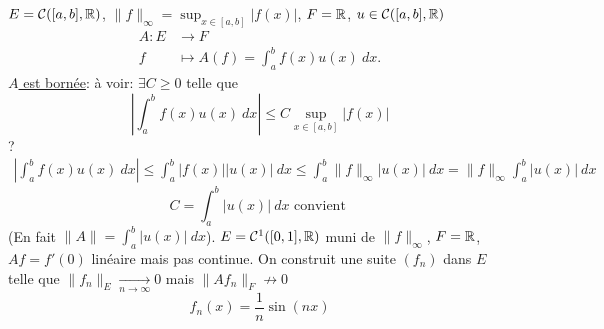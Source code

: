 \begin{eg}
    $E = \mathcal{C}([a, b], \mathbb{R})$, $\|f\|_{\infty} = \sup_{x \in [a, b]} |f(x)|$, $F = \mathbb{R}$, $u \in \mathcal{C}([a, b], \mathbb{R})$
    \begin{align*}
        A: E &\longrightarrow F \\
        f &\longmapsto A(f) = \int_{{a}}^{{b}} {f(x)u(x)} \: d{x} {}
    .\end{align*}
    \underline{$A$ est bornée}: à voir: $\exists C \ge 0$ telle que  
    \[
        \left| \int_{{a}}^{{b}} {f(x)u(x)} \: d{x} {} \right| \le C \sup_{x \in [a, b]} |f(x)|
    \] 
    ?
    \begin{align*}
        \left| \int_{{a}}^{{b}} {f(x)u(x)} \: d{x} {} \right| \le \int_{{a}}^{{b}} {|f(x)| |u(x)|} \: d{x} {} \le \int_{{a}}^{{b}} {\|f\|_{\infty}|u(x)|} \: d{x} {= \|f\|_{\infty} \int_{{a}}^{{b}} {|u(x)|} \: d{x} {}}
    \end{align*}
    \[
    C = \int_{{a}}^{{b}} {|u(x)|} \: d{x} \text{ convient }
    \] 
    (En fait $\|A\| = \int_{{a}}^{{b}} {|u(x)|} \: d{x} {}$). $E = \mathcal{C}^1([0,1], \mathbb{R})$ muni de $\|f\|_{\infty}$, $F = \mathbb{R}$, $Af = f'(0)$ linéaire mais pas continue. On construit une suite  $(f_n)$ dans  $E$ telle que  $\|f_n\|_E \xrightarrow[n \to  \infty]{} 0$ mais $\|Af_n\|_F \not\to 0$
    \[
    f_n(x) = \frac{1}{n}\sin(nx)
    \] 
\end{eg}
